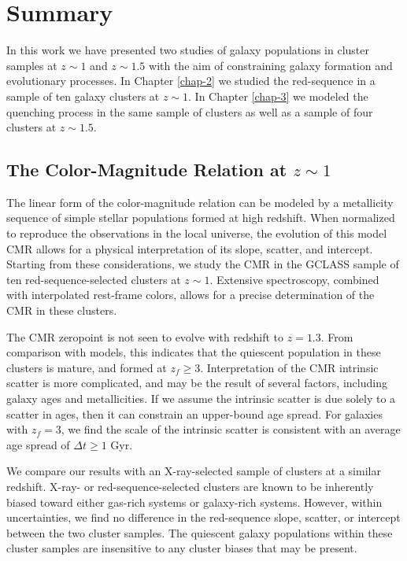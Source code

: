 \chapter{Summary}

In this work we have presented two studies of galaxy populations in cluster samples at $z\sim1$ and $z\sim1.5$ with the aim of constraining galaxy formation and evolutionary processes.
In Chapter \ref{chap-2} we studied the red-sequence in a sample of ten galaxy clusters at $z\sim1$.
In Chapter \ref{chap-3} we modeled the quenching process in the same sample of clusters as well as a sample of four clusters at $z\sim1.5$.

\section{The Color-Magnitude Relation at $z\sim1$}

The linear form of the color-magnitude relation can be modeled by a metallicity sequence of simple stellar populations formed at high redshift.
When normalized to reproduce the observations in the local universe, the evolution of this model CMR allows for a physical interpretation of its slope, scatter, and intercept.
Starting from these considerations, we study the CMR in the GCLASS sample of ten red-sequence-selected clusters at $z\sim1$.
Extensive spectroscopy, combined with interpolated rest-frame colors, allows for a precise determination of the CMR in these clusters.

The CMR zeropoint is not seen to evolve with redshift to $z=1.3$.
From comparison with models, this indicates that the quiescent population in these clusters is mature, and formed at $z_f \geq 3$.
Interpretation of the CMR intrinsic scatter is more complicated, and may be the result of several factors, including galaxy ages and metallicities.
If we assume the intrinsic scatter is due solely to a scatter in ages, then it can constrain an upper-bound age spread.
For galaxies with $z_f=3$, we find the scale of the intrinsic scatter is consistent with an average age spread of $\Delta t \geq 1$ Gyr.


We compare our results with an X-ray-selected sample of clusters at a similar redshift.
X-ray- or red-sequence-selected clusters are known to be inherently biased toward either gas-rich systems or galaxy-rich systems.
However, within uncertainties, we find no difference in the red-sequence slope, scatter, or intercept between the two cluster samples.
The quiescent galaxy populations within these cluster samples are insensitive to any cluster biases that may be present.

